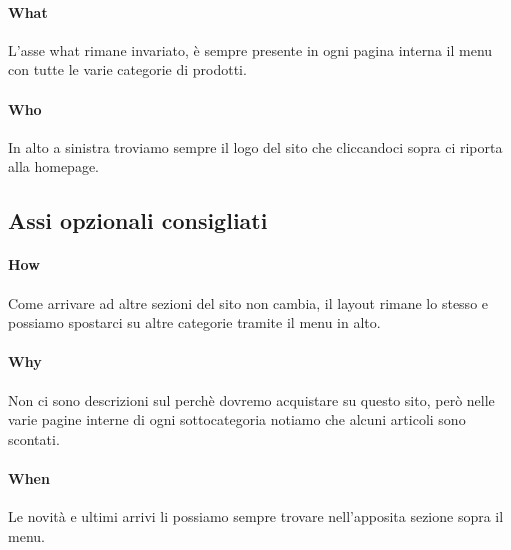 \documentclass[12pt]{article}
\begin{document}
	\paragraph{What} L'asse what rimane invariato, è sempre presente in ogni pagina interna il menu con tutte le varie categorie di prodotti.
	\paragraph{Who} In alto a sinistra troviamo sempre il logo del sito che cliccandoci sopra ci riporta alla homepage.
	\subsection{Assi opzionali consigliati}
	\paragraph{How} Come arrivare ad altre sezioni del sito non cambia, il layout rimane lo stesso e possiamo spostarci su altre categorie tramite il menu in alto.
	\paragraph{Why} Non ci sono descrizioni sul perchè dovremo acquistare su questo sito, però nelle varie pagine interne di ogni sottocategoria notiamo che alcuni articoli sono scontati.
	\paragraph{When} Le novità e ultimi arrivi li possiamo sempre trovare nell'apposita sezione sopra il menu.
	\newpage
\end{document}
